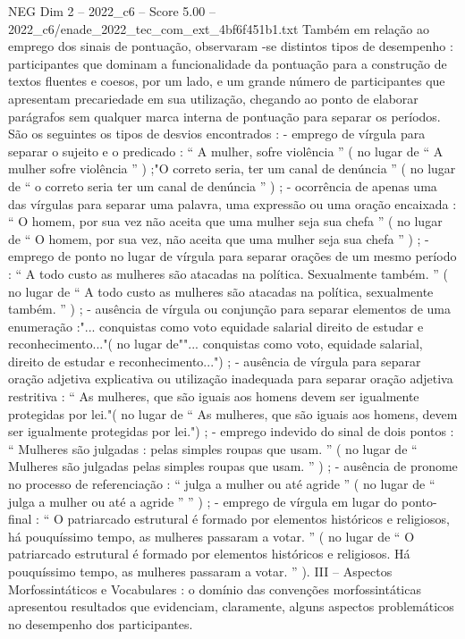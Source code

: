 \begin{textsample}{NEG Dim 2 – 2022\_c6 – Score 5.00 – 2022\_c6/enade\_2022\_tec\_com\_ext\_4bf6f451b1.txt}
Também em relação ao emprego dos sinais de pontuação, observaram -se distintos tipos de desempenho : participantes que dominam a funcionalidade da pontuação para a construção de textos fluentes e coesos, por um lado, e um grande número de participantes que apresentam precariedade em sua utilização, chegando ao ponto de elaborar parágrafos sem qualquer marca interna de pontuação para separar os períodos.
São os seguintes os tipos de desvios encontrados : - emprego de vírgula para separar o sujeito e o predicado : “ A mulher, sofre violência ” ( no lugar de “ A mulher sofre violência ” ) ;"O correto seria, ter um canal de denúncia ” ( no lugar de “ o correto seria ter um canal de denúncia ” ) ; - ocorrência de apenas uma das vírgulas para separar uma palavra, uma expressão ou uma oração encaixada : “ O homem, por sua vez não aceita que uma mulher seja sua chefa ” ( no lugar de “ O homem, por sua vez, não aceita que uma mulher seja sua chefa ” ) ; - emprego de ponto no lugar de vírgula para separar orações de um mesmo período : “ A todo custo as mulheres são atacadas na política.
Sexualmente também. ” ( no lugar de “ A todo custo as mulheres são atacadas na política, sexualmente também. ” ) ; - ausência de vírgula ou conjunção para separar elementos de uma enumeração :"... conquistas como voto equidade salarial direito de estudar e reconhecimento..."( no lugar de""... conquistas como voto, equidade salarial, direito de estudar e reconhecimento...") ; - ausência de vírgula para separar oração adjetiva explicativa ou utilização inadequada para separar oração adjetiva restritiva : “ As mulheres, que são iguais aos homens devem ser igualmente protegidas por lei."( no lugar de “ As mulheres, que são iguais aos homens, devem ser igualmente protegidas por lei.") ; - emprego indevido do sinal de dois pontos : “ Mulheres são julgadas : pelas simples roupas que usam. ” ( no lugar de “ Mulheres são julgadas pelas simples roupas que usam. ” ) ; - ausência de pronome no processo de referenciação : “ julga a mulher ou até agride ” ( no lugar de “ julga a mulher ou até a agride ” ” ) ; - emprego de vírgula em lugar do ponto-final : “ O patriarcado estrutural é formado por elementos históricos e religiosos, há pouquíssimo tempo, as mulheres passaram a votar. ” ( no lugar de “ O patriarcado estrutural é formado por elementos históricos e religiosos.
Há pouquíssimo tempo, as mulheres passaram a votar. ” ).
III – Aspectos Morfossintáticos e Vocabulares : o domínio das convenções morfossintáticas apresentou resultados que evidenciam, claramente, alguns aspectos problemáticos no desempenho dos participantes.

\end{textsample}

